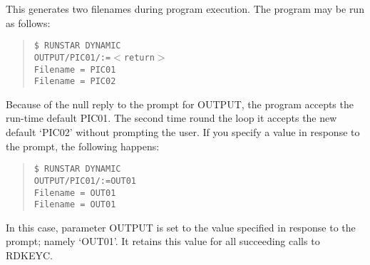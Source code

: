 This generates two filenames during program execution.
The program may be run as follows:
\begin{quote}
{\tt \$ RUNSTAR DYNAMIC\\
OUTPUT/PIC01/:=$<$return$>$\\
Filename = PIC01\\
Filename = PIC02}
\end{quote}
Because of the null reply to the prompt for OUTPUT, the program accepts the
run-time default PIC01.
The second time round the loop it accepts the new default `PIC02' without
prompting the user.
If you specify a value in response to the prompt, the following happens:
\begin{quote}
{\tt \$ RUNSTAR DYNAMIC\\
OUTPUT/PIC01/:=OUT01\\
Filename = OUT01\\
Filename = OUT01}
\end{quote}
In this case, parameter OUTPUT is set to the value specified in response to
the prompt; namely `OUT01'.
It retains this value for all succeeding calls to RDKEYC.
